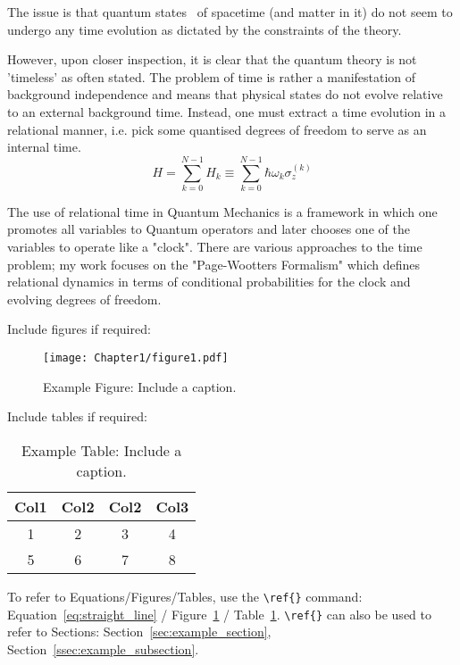 The issue is that quantum states~\cite{article_name} of spacetime (and matter in it) do not seem to undergo any time evolution as dictated by the constraints of the theory.
\begin{Frame}
However, upon closer inspection, it is clear that the quantum theory is not 'timeless' as often stated. The problem of time is rather a manifestation of background independence and means that physical states do not evolve relative to an external background time. Instead, one must extract a time evolution in a relational manner, i.e. pick some quantised degrees of freedom to serve as an internal time.
    \begin{equation}
\label{eq:glob_ham}
    H = \sum_{k = 0}^{N-1} H_k 	\equiv \sum_{k = 0}^{N-1} \hbar 
\omega_k \sigma_{z}^{(k)}
\end{equation} 
\end{Frame}
 The use of relational time in Quantum Mechanics is a framework in which one promotes all variables to Quantum operators and later chooses one of the variables to operate like a "clock". There are various approaches to the time problem; my work focuses on the "Page-Wootters Formalism" which defines relational dynamics in terms of conditional probabilities for the clock and evolving degrees of freedom.




Include figures if required:
\begin{figure}[ht!]
    \centering
    \texttt{[image: Chapter1/figure1.pdf]}
    \caption{Example Figure: Include a caption.}
    \label{fig:example_figure}
\end{figure}

\newpage

Include tables if required:
\begin{table}[ht!]
\centering
    \begin{tabular}{||c c c c||} 
     \hline
     Col1 & Col2 & Col2 & Col3 \\ [0.5ex] 
     \hline\hline
     1 & 2 & 3 & 4 \\ 
     \hline
     5 & 6 & 7 & 8 \\ 
     \hline
    \end{tabular}
\caption{Example Table: Include a caption.}
\label{table:example_table}
\end{table}

To refer to Equations/Figures/Tables, use the \verb!\ref{}! command: Equation~\ref{eq:straight_line} / Figure~\ref{fig:example_figure} / Table~\ref{table:example_table}. \verb!\ref{}! can also be used to refer to Sections: Section~\ref{sec:example_section}, Section~\ref{ssec:example_subsection}.

